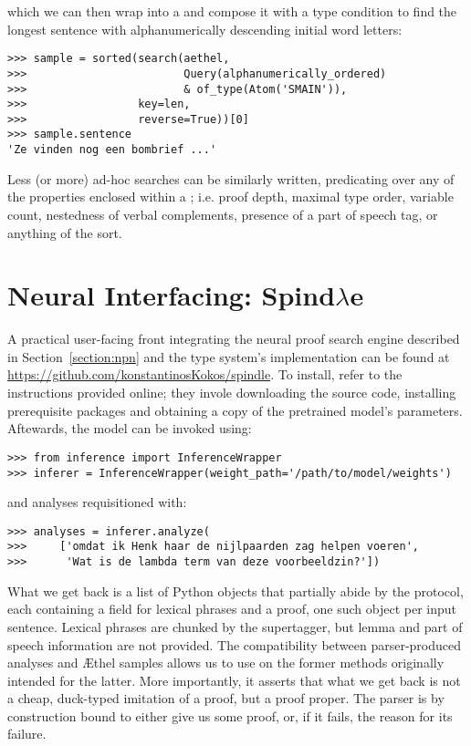 \noindent which we can then wrap into a  and compose it with a type condition to find the longest sentence with alphanumerically descending initial word letters:

\begin{verbatim}
>>> sample = sorted(search(aethel, 
>>>                        Query(alphanumerically_ordered)
>>>                        & of_type(Atom('SMAIN')),
>>>                 key=len,
>>>                 reverse=True))[0]
>>> sample.sentence
'Ze vinden nog een bombrief ...'
\end{verbatim}

\noindent Less (or more) ad-hoc searches can be similarly written, predicating over any of the properties enclosed within a ; i.e. proof depth, maximal type order, variable count, nestedness of verbal complements, presence of a part of speech tag, or anything of the sort.

\section{Neural Interfacing: Spind$\lambda$e}
\label{subappendix:spindle}
A practical user-facing front integrating the neural proof search engine described in Section~\ref{section:npn} and the type system's implementation can be found at
\url{https://github.com/konstantinosKokos/spindle}. 
To install, refer to the instructions provided online; they invole downloading the source code, installing prerequisite packages and obtaining a copy of the pretrained model's parameters.
Aftewards, the model can be invoked using:

\begin{verbatim}
>>> from inference import InferenceWrapper
>>> inferer = InferenceWrapper(weight_path='/path/to/model/weights')
\end{verbatim}

\noindent and analyses requisitioned with:
\begin{verbatim}
>>> analyses = inferer.analyze(
>>>     ['omdat ik Henk haar de nijlpaarden zag helpen voeren',
>>>      'Wat is de lambda term van deze voorbeeldzin?'])
\end{verbatim}

\noindent What we get back is a list of Python objects that partially abide by the  protocol, each containing a field for lexical phrases and a proof, one such object per input sentence.
Lexical phrases are chunked by the supertagger, but lemma and part of speech information are not provided.
The compatibility between parser-produced analyses and \AE thel samples allows us to use on the former methods originally intended for the latter.
More importantly, it asserts that what we get back is not a cheap, duck-typed imitation of a proof, but a proof proper. 
The parser is by construction bound to either give us some proof, or, if it fails, the reason for its failure. 

